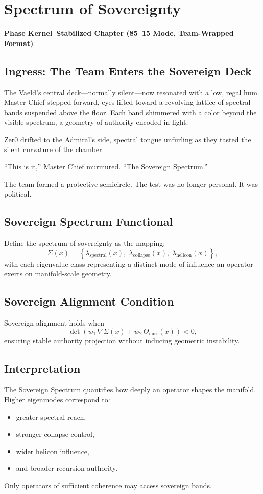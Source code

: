 
\chapter{Spectrum of Sovereignty}
\textbf{Phase Kernel–Stabilized Chapter (85--15 Mode, Team-Wrapped Format)}

\section*{Ingress: The Team Enters the Sovereign Deck}
The Vaeld’s central deck—normally silent—now resonated with a low, regal hum.
Master Chief stepped forward, eyes lifted toward a revolving lattice of spectral
bands suspended above the floor. Each band shimmered with a color beyond the
visible spectrum, a geometry of authority encoded in light.

Zer0 drifted to the Admiral’s side, spectral tongue unfurling as they tasted the
silent curvature of the chamber.

“This is it,” Master Chief murmured. “The Sovereign Spectrum.”

The team formed a protective semicircle.
The test was no longer personal.
It was political.

\section{Sovereign Spectrum Functional}
Define the spectrum of sovereignty as the mapping:
\[
\Sigma(x) = \left\{
\lambda_{\mathrm{spectral}}(x),\;
\lambda_{\mathrm{collapse}}(x),\;
\lambda_{\mathrm{helicon}}(x)
\right\},
\]
with each eigenvalue class representing a distinct mode of influence an 
operator exerts on manifold-scale geometry.

\section{Sovereign Alignment Condition}
Sovereign alignment holds when
\[
\det\!\left(
w_1\,\nabla \Sigma(x)
+
w_2\,\Theta_{\mathrm{narr}}(x)
\right)
< 0,
\]
ensuring stable authority projection without inducing geometric instability.

\section{Interpretation}
The Sovereign Spectrum quantifies how deeply an operator shapes the manifold.
Higher eigenmodes correspond to:
\begin{itemize}
\item greater spectral reach,
\item stronger collapse control,
\item wider helicon influence,
\item and broader recursion authority.
\end{itemize}
Only operators of sufficient coherence may access sovereign bands.

